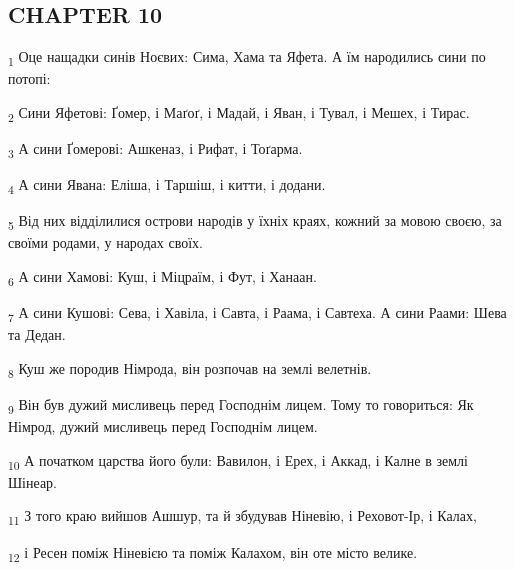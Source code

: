 \subsection{CHAPTER 10}
\begin{tcolorbox}
\textsubscript{1} Оце нащадки синів Ноєвих: Сима, Хама та Яфета. А їм народились сини по потопі:
\end{tcolorbox}
\begin{tcolorbox}
\textsubscript{2} Сини Яфетові: Ґомер, і Маґоґ, і Мадай, і Яван, і Тувал, і Мешех, і Тирас.
\end{tcolorbox}
\begin{tcolorbox}
\textsubscript{3} А сини Ґомерові: Ашкеназ, і Рифат, і Тоґарма.
\end{tcolorbox}
\begin{tcolorbox}
\textsubscript{4} А сини Явана: Еліша, і Таршіш, і китти, і додани.
\end{tcolorbox}
\begin{tcolorbox}
\textsubscript{5} Від них відділилися острови народів у їхніх краях, кожний за мовою своєю, за своїми родами, у народах своїх.
\end{tcolorbox}
\begin{tcolorbox}
\textsubscript{6} А сини Хамові: Куш, і Міцраїм, і Фут, і Ханаан.
\end{tcolorbox}
\begin{tcolorbox}
\textsubscript{7} А сини Кушові: Сева, і Хавіла, і Савта, і Раама, і Савтеха. А сини Раами: Шева та Дедан.
\end{tcolorbox}
\begin{tcolorbox}
\textsubscript{8} Куш же породив Німрода, він розпочав на землі велетнів.
\end{tcolorbox}
\begin{tcolorbox}
\textsubscript{9} Він був дужий мисливець перед Господнім лицем. Тому то говориться: Як Німрод, дужий мисливець перед Господнім лицем.
\end{tcolorbox}
\begin{tcolorbox}
\textsubscript{10} А початком царства його були: Вавилон, і Ерех, і Аккад, і Калне в землі Шінеар.
\end{tcolorbox}
\begin{tcolorbox}
\textsubscript{11} З того краю вийшов Ашшур, та й збудував Ніневію, і Реховот-Ір, і Калах,
\end{tcolorbox}
\begin{tcolorbox}
\textsubscript{12} і Ресен поміж Ніневією та поміж Калахом, він оте місто велике.
\end{tcolorbox}
